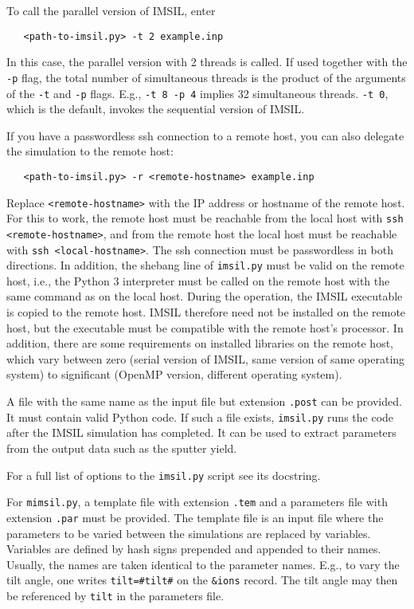 To call the parallel version of IMSIL, enter
%
\begin{verbatim}
   <path-to-imsil.py> -t 2 example.inp
\end{verbatim}
%
In this case, the parallel version with 2 threads is called. If used together 
with the \texttt{-p} flag, the total number of simultaneous threads is the 
product of the arguments of the \texttt{-t} and \texttt{-p} flags. E.g.,
\texttt{-t 8 -p 4} implies 32 simultaneous threads. \texttt{-t 0}, which is 
the default, invokes the sequential version of IMSIL.

If you have a passwordless ssh connection to a remote host, you can also
delegate the simulation to the remote host:
%
\begin{verbatim}
   <path-to-imsil.py> -r <remote-hostname> example.inp
\end{verbatim}
%
Replace \texttt{<remote-hostname>} with the IP address or hostname of the
remote host. For this to work, the remote host must be reachable from the local
host with \texttt{ssh <remote-hostname>}, and from the remote host the local
host must be reachable with \texttt{ssh <local-hostname>}. The ssh connection
must be passwordless in both directions. In addition, the shebang line of
\texttt{imsil.py} must be valid on the remote host, i.e., the Python 3
interpreter must be called on the remote host with the same command as on the
local host. During the operation, the IMSIL executable is copied to the remote
host. IMSIL therefore need not be installed on the remote host, but the
executable must be compatible with the remote host's processor. In addition,
there are some requirements on installed libraries on the remote host,
which vary between zero (serial version of IMSIL, same version of same 
operating system) to significant (OpenMP version, different operating system). 

A file with the same name as the input file but extension \texttt{.post} can
be provided. It must contain valid Python code. If such a file exists,
\texttt{imsil.py} runs the code after the IMSIL simulation has completed.
It can be used to extract parameters from the output data such as the sputter
yield. 

For a full list of options to the \texttt{imsil.py} script see its docstring.

For \texttt{mimsil.py}, a template file with extension \texttt{.tem} and a
parameters file with extension \texttt{.par} must be provided. The template file
is an input file where the parameters to be varied between the simulations are 
replaced by variables. Variables are defined by hash signs prepended and
appended to their names. Usually, the names are taken identical to the parameter 
names. E.g., to vary the tilt angle, one writes \texttt{tilt=\#tilt\#} on the
\texttt{\&ions} record. The tilt angle may then be referenced by \texttt{tilt}
in the parameters file.

